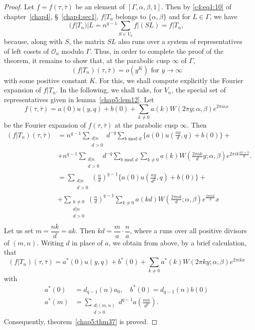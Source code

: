 \begin{proof}
Let $f=f(\tau,\bar{\tau})$ be an element of $[\Gamma, \alpha,
  \beta,1]$. Then by \eqref{c4:eq1:10} of chapter~\ref{chap4}, 
\S~\ref{chap4:sec1}, $f|T_n$ belongs to
$\{\alpha, \beta\}$ and for $L\in \Gamma$, we have 
$$
(f|T_n) |L = n^{q-1} \sum_{S\in V_n} f|(SL) = f|T_n,
$$
because, along with $S$, the matrix $SL$ also runs over a system of
representatives of left cosets of $\mathcal{O}_n$ modulo
$\Gamma$. Thus, in order to complete the proof of the theorem, it
remains to show that, at the parabolic cusp $\infty$ of $\Gamma$, 
$$
(f|T_n) (\tau,\bar{\tau}) = o (y^K) \text{ for } y \to \infty 
$$
with \pageoriginale some positive constant $K$. For this, we shall
compute explicitly the Fourier expansion of $f|T_n$. In the following,
we shall take, for $V_n$, the special set of representatives given in
lemma~\ref{chap5:lem12}. Let 
\begin{equation*}
f(\tau,\bar{\tau}) = a(0) u(y,q) + b(0) + \sum_{k\neq 0} a(k) W(2\pi
y;\alpha, \beta) e^{2\pi i \kappa x} \tag{3}\label{c5:eq3:3}
\end{equation*}
be the Fourier expansion of $f(\tau,\bar{\tau})$ at the parabolic cusp
$\infty$. Then 
\begin{align*}
(f|T_n) (\tau,\bar{\tau}) & = n^{q-1} \sum_{\substack{d|n\\d>0}}
  d^{-q} \sum_{b\text{ mod } d} \{a(0) u (\frac{ay}{d}, q) + b(0)\} + \\
& + n^{q-1} \sum_{\substack{d|n\\d>0}} d^{-q} \sum_{b \text{ mod }d}
  \sum_{k\neq 0} a(k) W (\frac{2\pi a k}{d}y;\alpha,\beta) e^{2\pi i k
  \frac{ax+b}{d}}.\\
& = \sum_{\substack{d|n\\d>0}} (\frac{n}{d})^{q-1} \{a(0) u
  (\frac{ny}{d^2}, q) + b(0)\} +\\
& + \sum_{\substack{k\neq 0\\d|n\\d>0}} (\frac{n}{d})^{q-1} \sum_{k\neq
  0} a(kd) W(\frac{2\pi n k}{d}; \alpha,\beta) e^{\frac{2\pi i n
      k}{d}} x\\
\end{align*}
Let us set $m=\dfrac{nk}{d}=ak$. Then $kd=\dfrac{m}{a}\cdot
\dfrac{n}{a}$, where a runs over all positive divisors of
$(m,n)$. Writing $d$ in place of $a$, we obtain from above, by a brief
calculation, that 
\begin{equation*}
(f|T_n) (\tau,\bar{\tau}) = a^{\ast} (0) u (y,q) + b^{\ast}(0) +
  \sum_{k\neq 0} a^{\ast} (k) W(2\pi k y;\alpha,\beta) e^{2\pi i k x}
  \tag{4} \label{c5:eq3:4}
\end{equation*}
with 
\begin{align*}
a^{\ast}(0) & = d_{q-1} (n) a_0, \quad b^{\ast} (0) = d_{q-1} (n) b(0)
\\
a^{\ast}(m)& = \sum_{\substack{d|(m,n)\\d>0}} d^{q-1}
a(\frac{mn}{d^2}). \tag{5}\label{c5:eq3:5}
\end{align*}
Consequently, \pageoriginale theorem~\ref{chap5:thm37} is proved.
\end{proof}

